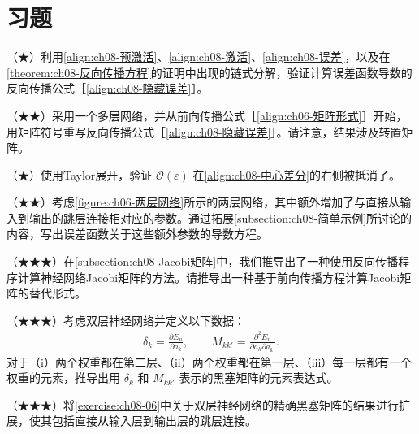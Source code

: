 \documentclass[../../main.tex]{subfiles}
\begin{document}
\section{习题}\label{section:ch08-习题}

\begin{exercise}\label{exercise:ch08-01}
（★）利用\eqref{align:ch08-预激活}、\eqref{align:ch08-激活}、\eqref{align:ch08-误差}，以及在\cref{theorem:ch08-反向传播方程}的证明中出现的链式分解，验证计算误差函数导数的反向传播公式［\eqref{align:ch08-隐藏误差}］。
\end{exercise}

\begin{exercise}\label{exercise:ch08-02}
（★★）采用一个多层网络，并从前向传播公式［\eqref{align:ch06-矩阵形式}］开始，用矩阵符号重写反向传播公式［\eqref{align:ch08-隐藏误差}］。请注意，结果涉及转置矩阵。
\end{exercise}

\begin{exercise}\label{exercise:ch08-03}
（★）使用Taylor展开，验证 $\mathcal{O}(\varepsilon)$ 在\eqref{align:ch08-中心差分}的右侧被抵消了。
\end{exercise}

\begin{exercise}\label{exercise:ch08-04}
（★★）考虑\cref{figure:ch06-两层网络}所示的两层网络，其中额外增加了与直接从输入到输出的跳层连接相对应的参数。通过拓展\cref{subsection:ch08-简单示例}所讨论的内容，写出误差函数关于这些额外参数的导数方程。
\end{exercise}

\begin{exercise}\label{exercise:ch08-05}
（★★★）在\cref{subsection:ch08-Jacobi矩阵}中，我们推导出了一种使用反向传播程序计算神经网络Jacobi矩阵的方法。请推导出一种基于前向传播方程计算Jacobi矩阵的替代形式。
\end{exercise}

\begin{exercise}\label{exercise:ch08-06}
（★★★）考虑双层神经网络并定义以下数据：
\begin{align}
\delta_k=\frac{\partial E_n}{\partial a_k},\qquad
M_{kk'}=\frac{\partial^{2}E_n}{\partial a_k\partial a_{k'}}.
\label{align:ch08-习题deltaM}
\end{align}
对于（i）两个权重都在第二层、（ii）两个权重都在第一层、（iii）每一层都有一个权重的元素，推导出用 $\delta_k$ 和 $M_{kk'}$ 表示的黑塞矩阵的元素表达式。
\end{exercise}

\begin{exercise}\label{exercise:ch08-07}
（★★★）将\cref{exercise:ch08-06}中关于双层神经网络的精确黑塞矩阵的结果进行扩展，使其包括直接从输入层到输出层的跳层连接。
\end{exercise}
\end{document}
